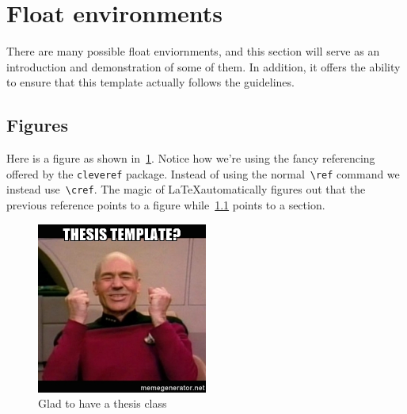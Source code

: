 









\section{Float environments}
There are many possible float enviornments, and this section will serve as an introduction and demonstration of some of them.
In addition, it offers the ability to ensure that this template actually follows the guidelines.

\subsection{Figures}\label{ssec:figures}

Here is a figure as shown in~\cref{fig:picard}.
Notice how we're using the fancy referencing offered by the \verb+cleveref+ package. 
Instead of using the normal~\verb+\ref+ command we instead use~\verb+\cref+. 
The magic of \LaTeX automatically figures out that the previous reference points to a figure while~\cref{ssec:figures} points to a section.

\begin{figure}
    \centering
    \includegraphics[width=0.5\textwidth]{figures/picard_yes.jpg}
    \caption[Damage report!]{Glad to have a thesis class\label{fig:picard}}
\end{figure}

